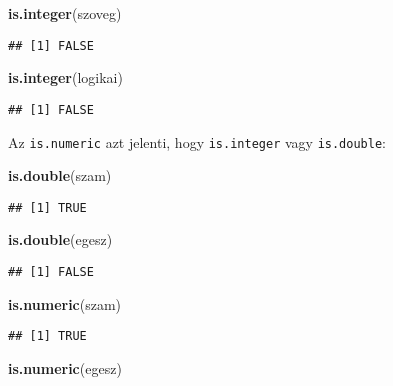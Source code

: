 \documentclass[
]{book}
\newenvironment{Shaded}{\begin{snugshade}}{\end{snugshade}}
\newcommand{\KeywordTok}[1]{\textcolor[rgb]{0.13,0.29,0.53}{\textbf{#1}}}
\newcommand{\NormalTok}[1]{#1}
\begin{document}
\begin{Shaded}
\begin{Highlighting}[]
\KeywordTok{is.integer}\NormalTok{(szoveg)}
\end{Highlighting}
\end{Shaded}

\begin{verbatim}
## [1] FALSE
\end{verbatim}

\begin{Shaded}
\begin{Highlighting}[]
\KeywordTok{is.integer}\NormalTok{(logikai)}
\end{Highlighting}
\end{Shaded}

\begin{verbatim}
## [1] FALSE
\end{verbatim}

Az \texttt{is.numeric} azt jelenti, hogy \texttt{is.integer} vagy \texttt{is.double}:

\begin{Shaded}
\begin{Highlighting}[]
\KeywordTok{is.double}\NormalTok{(szam)}
\end{Highlighting}
\end{Shaded}

\begin{verbatim}
## [1] TRUE
\end{verbatim}

\begin{Shaded}
\begin{Highlighting}[]
\KeywordTok{is.double}\NormalTok{(egesz)}
\end{Highlighting}
\end{Shaded}

\begin{verbatim}
## [1] FALSE
\end{verbatim}

\begin{Shaded}
\begin{Highlighting}[]
\KeywordTok{is.numeric}\NormalTok{(szam)}
\end{Highlighting}
\end{Shaded}

\begin{verbatim}
## [1] TRUE
\end{verbatim}

\begin{Shaded}
\begin{Highlighting}[]
\KeywordTok{is.numeric}\NormalTok{(egesz)}
\end{Highlighting}
\end{Shaded}
\end{document}
